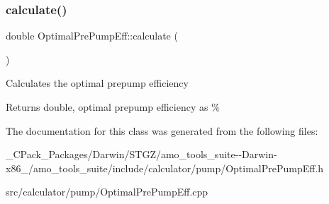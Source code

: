 \subsubsection{\texorpdfstring{calculate()}{calculate()}\hspace{0.1cm}{\footnotesize\ttfamily [3/3]}}
{\footnotesize\ttfamily double Optimal\+Pre\+Pump\+Eff\+::calculate (\begin{DoxyParamCaption}{ }\end{DoxyParamCaption})}

Calculates the optimal prepump efficiency \begin{DoxyReturn}{Returns}
double, optimal prepump efficiency as \% 
\end{DoxyReturn}


The documentation for this class was generated from the following files\+:\begin{DoxyCompactItemize}
\item 
\+\_\+\+C\+Pack\+\_\+\+Packages/\+Darwin/\+S\+T\+G\+Z/amo\+\_\+tools\+\_\+suite-\/-\/\+Darwin-\/x86\+\_/amo\+\_\+tools\+\_\+suite/include/calculator/pump/Optimal\+Pre\+Pump\+Eff.\+h\item 
src/calculator/pump/Optimal\+Pre\+Pump\+Eff.\+cpp\end{DoxyCompactItemize}
